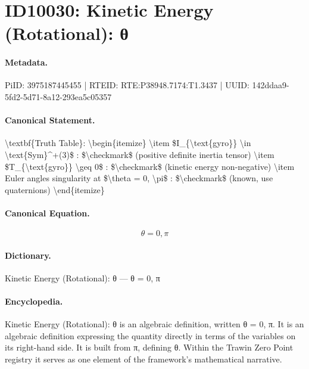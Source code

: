 \section*{ID10030: Kinetic Energy (Rotational): θ}
\paragraph{Metadata.}
PiID: 3975187445455 | RTEID: RTE:P38948.7174:T1.3437 | UUID: 142ddaa9-5fd2-5d71-8a12-293ea5c05357

\paragraph{Canonical Statement.}
\textbackslash{}textbf\{Truth Table\}: \textbackslash{}begin\{itemize\} \textbackslash{}item \$I\_\{\textbackslash{}text\{gyro\}\} \textbackslash{}in \textbackslash{}text\{Sym\}\textasciicircum{}+(3)\$ : \$\textbackslash{}checkmark\$ (positive definite inertia tensor) \textbackslash{}item \$T\_\{\textbackslash{}text\{gyro\}\} \textbackslash{}geq 0\$ : \$\textbackslash{}checkmark\$ (kinetic energy non-negative) \textbackslash{}item Euler angles singularity at \$\textbackslash{}theta = 0, \textbackslash{}pi\$ : \$\textbackslash{}checkmark\$ (known, use quaternions) \textbackslash{}end\{itemize\}

\paragraph{Canonical Equation.}
\[
\theta = 0, \pi
\]

\paragraph{Dictionary.}
Kinetic Energy (Rotational): θ — θ = 0, π

\paragraph{Encyclopedia.}
Kinetic Energy (Rotational): θ is an algebraic definition, written θ = 0, π. It is an algebraic definition expressing the quantity directly in terms of the variables on its right-hand side. It is built from π, defining θ. Within the Trawin Zero Point registry it serves as one element of the framework's mathematical narrative.
